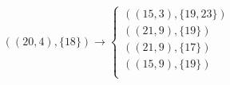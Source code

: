 \begin{minipage}{5.0cm}
\vspace{-1cm}


%
\fontsize{8}{10}\selectfont \[((20,4),\{18\}) \rightarrow \begin{cases}
((15,3),\{19,23\}) \\
((21,9),\{19\}) \\
((21,9),\{17\})\\
((15,9),\{19\}) \\
\end{cases}\]
%
\end{minipage}
